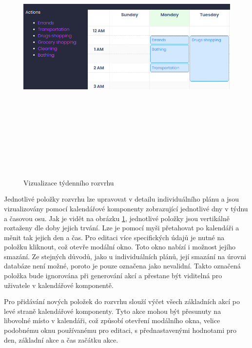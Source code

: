 \documentclass[
  glossaries,
]{kidiplom}
\begin{document}
\begin{figure}[H]
  	\centering
 	 \includegraphics[width=14cm,height=14cm,keepaspectratio]{schedule_visual}
 	 \caption{Vizualizace týdenního rozvrhu}
 	 \label{fig:scheduleVisual}
\end{figure}

Jednotlivé položky rozvrhu lze upravovat v detailu individuálního plánu a jsou vizualizovány pomocí kalendářové komponenty zobrazující jednotlivé dny v týdnu a časovou osu. Jak je vidět na obrázku \ref{fig:scheduleVisual}, jednotlivé položky jsou vertikálně roztaženy dle doby jejich trvání. Lze je pomocí myši přetahovat po kalendáři a měnit tak jejich den a čas. Pro editaci více specifických údajů je nutné na položku kliknout, což otevře modální okno. Toto okno nabízí i možnost jejího smazání. Ze stejných důvodů, jako u individuálních plánů, její smazání na úrovni databáze není možné, poroto je pouze označena jako nevalidní. Takto označená položka bude ignorována při generování akcí a přestane být viditelná pro uživatele v kalendářové komponentě.

Pro přidávání nových položek do rozvrhu slouží výčet všech základních akcí po levé straně kalendářové komponenty. Tyto akce mohou být přesunuty na libovolné místo v kalendáři, což způsobí otevření modálního okna, velice podobnému oknu používanému pro editaci, s přednastavenými hodnotami pro den, základní akce a čas začátku akce.
\end{document}
